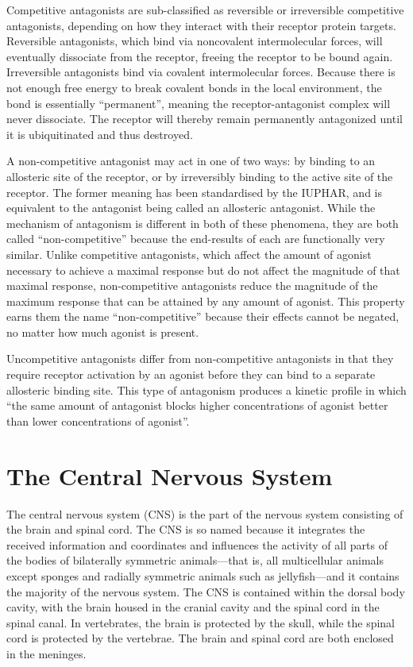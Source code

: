 Competitive antagonists are sub-classified as reversible or irreversible competitive antagonists, depending on how they interact with their receptor protein targets. Reversible antagonists, which bind via noncovalent intermolecular forces, will eventually dissociate from the receptor, freeing the receptor to be bound again. Irreversible antagonists bind via covalent intermolecular forces. Because there is not enough free energy to break covalent bonds in the local environment, the bond is essentially ``permanent'', meaning the receptor-antagonist complex will never dissociate. The receptor will thereby remain permanently antagonized until it is ubiquitinated and thus destroyed.

A non-competitive antagonist may act in one of two ways: by binding to an allosteric site of the receptor, or by irreversibly binding to the active site of the receptor. The former meaning has been standardised by the IUPHAR, and is equivalent to the antagonist being called an allosteric antagonist. While the mechanism of antagonism is different in both of these phenomena, they are both called ``non-competitive'' because the end-results of each are functionally very similar. Unlike competitive antagonists, which affect the amount of agonist necessary to achieve a maximal response but do not affect the magnitude of that maximal response, non-competitive antagonists reduce the magnitude of the maximum response that can be attained by any amount of agonist. This property earns them the name ``non-competitive'' because their effects cannot be negated, no matter how much agonist is present.

Uncompetitive antagonists differ from non-competitive antagonists in that they require receptor activation by an agonist before they can bind to a separate allosteric binding site. This type of antagonism produces a kinetic profile in which ``the same amount of antagonist blocks higher concentrations of agonist better than lower concentrations of agonist''.

\hypertarget{the-central-nervous-system}{%
\chapter{The Central Nervous System}\label{the-central-nervous-system}}

The central nervous system (CNS) is the part of the nervous system consisting of the brain and spinal cord. The CNS is so named because it integrates the received information and coordinates and influences the activity of all parts of the bodies of bilaterally symmetric animals---that is, all multicellular animals except sponges and radially symmetric animals such as jellyfish---and it contains the majority of the nervous system. The CNS is contained within the dorsal body cavity, with the brain housed in the cranial cavity and the spinal cord in the spinal canal. In vertebrates, the brain is protected by the skull, while the spinal cord is protected by the vertebrae. The brain and spinal cord are both enclosed in the meninges.

